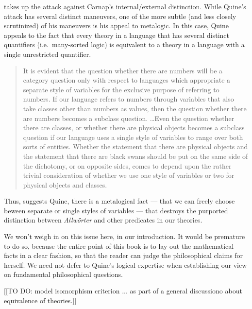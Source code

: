 \cite{quine1951a,quine1960} takes up the attack against Carnap's
internal/external distinction.  While Quine's attack has several
distinct maneuvers, one of the more subtle (and less closely
scrutinized) of his maneuvers is his appeal to metalogic.  In this
case, Quine appeals to the fact that every theory in a language that
has several distinct quantifiers (i.e.\ many-sorted logic) is
equivalent to a theory in a language with a single unrestricted
quantifier.  \begin{quote} It is evident that the question whether
  there are numbers will be a category question only with respect to
  languages which appropriate a separate style of variables for the
  exclusive purpose of referring to numbers.  If our language refers
  to numbers through variables that also take classes other than
  numbers as values, then the question whether there are numbers
  becomes a subclass question. \ldots Even the question whether there
  are classes, or whether there are physical objects becomes a
  subclass question if our language uses a single style of variables
  to range over both sorts of entities.  Whether the statement that
  there are physical objects and the statement that there are black
  swans should be put on the same side of the dichotomy, or on
  opposite sides, comes to depend upon the rather trivial
  consideration of whether we use one style of variables or two for
  physical objects and classes. \end{quote} Thus, suggests Quine,
there is a metalogical fact --- that we can freely choose beween
separate or single styles of variables --- that destroys the purported
distinction between {\it Allw\"orter} and other predicates in our
theories.

We won't weigh in on this issue here, in our introduction.  It would
be premature to do so, because the entire point of this book is to lay
out the mathematical facts in a clear fashion, so that the reader can
judge the philosophical claims for herself.  We need not defer to
Quine's logical expertise when establishing our view on fundamental
philosophical questions.


\bigskip \bigskip











[[TO DO: model isomorphism criterion ... as part of a general
discussiono about equivalence of theories.]]

